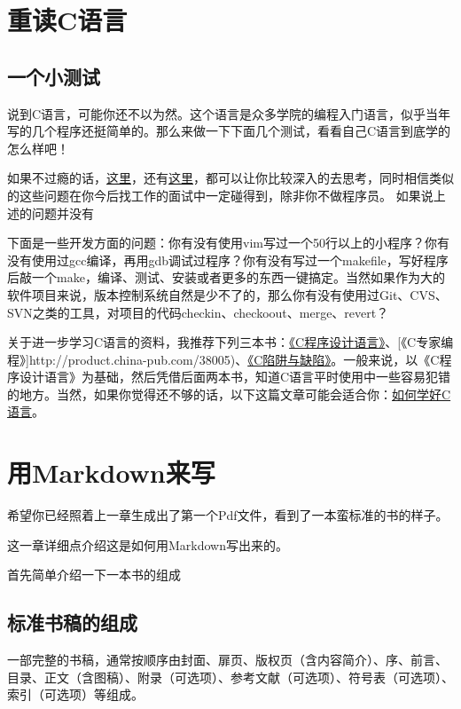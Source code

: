\documentclass[a4paper]{book}
\renewcommand{\headrulewidth}{0pt}
\newcommand{\chap}[1]{\newpage\thispagestyle{empty}\chapter{#1}\label{chap:\thechapter}}
\begin{document}
\pagestyle{fancy}

\mainmatter
\chap{重读C语言}

\section{一个小测试}

说到C语言，可能你还不以为然。这个语言是众多学院的编程入门语言，似乎当年写的几个程序还挺简单的。那么来做一下下面几个测试，看看自己C语言到底学的怎么样吧！

如果不过瘾的话，\href{http://coolshell.cn/articles/945.html}{这里}，还有\href{http://coolshell.cn/articles/873.html}{这里}，都可以让你比较深入的去思考，同时相信类似的这些问题在你今后找工作的面试中一定碰得到，除非你不做程序员。 如果说上述的问题并没有

下面是一些开发方面的问题：你有没有使用vim写过一个50行以上的小程序？你有没有使用过gcc编译，再用gdb调试过程序？你有没有写过一个makefile，写好程序后敲一个make，编译、测试、安装或者更多的东西一键搞定。当然如果作为大的软件项目来说，版本控制系统自然是少不了的，那么你有没有使用过Git、CVS、SVN之类的工具，对项目的代码checkin、checkoout、merge、revert？

关于进一步学习C语言的资料，我推荐下列三本书：\href{http://product.china-pub.com/14975\&ref=browse}{《C程序设计语言》}、{[}《C专家编程》{]}http://product.china-pub.com/38005)、\href{http://product.china-pub.com/38125}{《C陷阱与缺陷》}。一般来说，以《C程序设计语言》为基础，然后凭借后面两本书，知道C语言平时使用中一些容易犯错的地方。当然，如果你觉得还不够的话，以下这篇文章可能会适合你：\href{http://coolshell.cn/articles/4102.html}{如何学好C语言}。

\chap{用Markdown来写}

希望你已经照着上一章生成出了第一个Pdf文件，看到了一本蛮标准的书的样子。

这一章详细点介绍这是如何用Markdown写出来的。

首先简单介绍一下一本书的组成

\section{标准书稿的组成}

一部完整的书稿，通常按顺序由封面、扉页、版权页（含内容简介）、序、前言、目录、正文（含图稿）、附录（可选项）、参考文献（可选项）、符号表（可选项）、索引（可选项）等组成。
\end{document}

